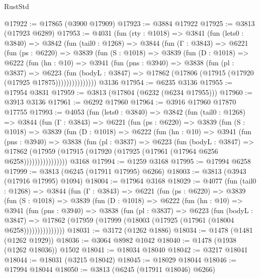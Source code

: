 \begin{lexlean}{RustStd}
\begin{coremodule}
{\begin{coremodule}
{{{{{{{{{{{{{{{{{{{{{{{{{{{{{{{{{{{@17922 := @17865 (@3900 @17909)
@17923 := @3884 @17922
@17925 := @3813 (@17923 @6289)
@17953 := @4031
    (fun (rty : @1018) =>
    @3841
      (fun (lets0 : @3840) =>
      @3842
        (fun (tail0 : @1268) =>
        @3844
          (fun (Γ : @3843) =>
          @6221
            (fun (ps : @6220) =>
            @3839
              (fun (S : @1018) =>
              @3839
                (fun (D : @1018) =>
                @6222
                  (fun (hn : @10) =>
                  @3941
                    (fun (pns : @3940) =>
                    @3838
                      (fun (pl : @3837) =>
                      @6223
                        (fun (bodyL : @3847) =>
                        @17862 (@17806 (@17915 (@17920 (@17925 @17875)))))))))))))))
    @3136
@17954 := @6235 @3136
@17955 := @17954 @3831
@17959 := @3813 (@17804 (@6232 (@6234 @17955)))
@17960 := @3913 @3136
@17961 := @6292 @17960
@17964 := @3916 @17960 @17870 @17755
@17993 := @4053
    (fun (lets0 : @3840) =>
    @3842
      (fun (tail0 : @1268) =>
      @3844
        (fun (Γ : @3843) =>
        @6221
          (fun (ps : @6220) =>
          @3839
            (fun (S : @1018) =>
            @3839
              (fun (D : @1018) =>
              @6222
                (fun (hn : @10) =>
                @3941
                  (fun (pns : @3940) =>
                  @3838
                    (fun (pl : @3837) =>
                    @6223
                      (fun (bodyL : @3847) =>
                      @17862
                        (@17959 (@17915 (@17920 (@17925 (@17961 (@17964 @6256 @6258))))))))))))))))
    @3168
@17994 := @1259 @3168
@17995 := @17994 @6258
@17999 := @3813 (@6245 (@17911 @17995) @6266)
@18003 := @3813 (@3943 (@17916 @17995) @1094)
@18004 := @17964 @3168
@18029 := @4077
    (fun (tail0 : @1268) =>
    @3844
      (fun (Γ : @3843) =>
      @6221
        (fun (ps : @6220) =>
        @3839
          (fun (S : @1018) =>
          @3839
            (fun (D : @1018) =>
            @6222
              (fun (hn : @10) =>
              @3941
                (fun (pns : @3940) =>
                @3838
                  (fun (pl : @3837) =>
                  @6223
                    (fun (bodyL : @3847) =>
                    @17862 (@17959 (@17999 (@18003 (@17925 (@17961 (@18004 @6258)))))))))))))))
@18031 := @3172 (@1262 @1886)
@18034 := @1478 (@1481 (@1262 @1929))
@18036 := @3064 @8982 @1042
@18040 := @1478 (@1938 (@1262 @18036)) @1502
@18041 := @18034 @18040
@18042 := @3217 @18041
@18044 := @18031 (@3215 @18042)
@18045 := @18029 @18044
@18046 := @17994 @18044
@18050 := @3813 (@6245 (@17911 @18046) @6266)
}}}}}}}}}}}}}}}}}}}}}}}}}}}}}}}}}}}
\end{coremodule}}
\end{coremodule}
\end{lexlean}
